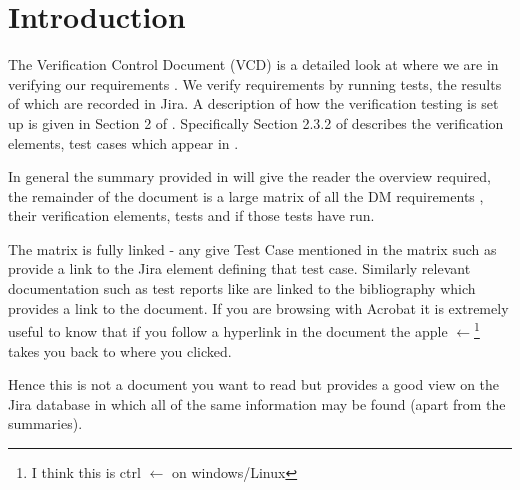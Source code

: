 
\section{Introduction}
\label{sec:intro}

The Verification Control Document (VCD) is a detailed look at where we are in verifying our requirements .
We verify requirements by
running tests, the results of which are recorded in Jira.  A description of how the verification testing is set up is given in Section 2 of .
Specifically Section 2.3.2 of  describes the verification elements, test cases which appear in .

In general the summary provided in  will give the reader the overview required, the remainder of the document is a large matrix of all the DM requirements , their verification elements, tests and if those tests have run.

The matrix is fully linked - any give Test Case mentioned in the matrix such as  provide a link to the Jira element defining that test case. Similarly relevant documentation such as test reports like  are linked to the bibliography which provides a link to the document.
If you are browsing with Acrobat it is extremely useful to know that if you follow a hyperlink in the document the  apple $\leftarrow$\footnote{I think this is ctrl $\leftarrow$ on windows/Linux} takes you back to where you clicked.

Hence this is not a document you want to read but provides a good view on the Jira database in which all of the same information may be found (apart from the summaries).
